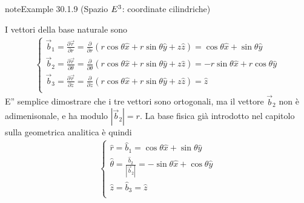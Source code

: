 \documentclass[letterpaper,10pt,italian]{jupyterBook}
\begin{document}
\begin{sphinxadmonition}{note}{Example 30.1.9 (Spazio \protect\(E^3\protect\): coordinate cilindriche)}



\sphinxAtStartPar
I vettori della base naturale sono
\begin{equation*}
\begin{split}\begin{cases}
  \vec{b}_1 = \frac{\partial \vec{r}}{\partial r     } = \frac{\partial }{\partial r     } \left( r \cos \theta \hat{x} + r \sin \theta \hat{y} + z \hat{z} \right) = \cos \theta \hat{x} + \sin \theta \hat{y} \\
  \vec{b}_2 = \frac{\partial \vec{r}}{\partial \theta} = \frac{\partial }{\partial \theta} \left( r \cos \theta \hat{x} + r \sin \theta \hat{y} + z \hat{z} \right) = -r\sin \theta \hat{x} + r \cos \theta\hat{y} \\
  \vec{b}_3 = \frac{\partial \vec{r}}{\partial z     } = \frac{\partial }{\partial z     } \left( r \cos \theta \hat{x} + r \sin \theta \hat{y} + z \hat{z} \right) = \hat{z} \\
\end{cases}\end{split}
\end{equation*}
\sphinxAtStartPar
E” semplice dimostrare che i tre vettori sono ortogonali, ma il vettore \(\vec{b}_2\) non è adimenisonale, e ha modulo \(|\vec{b}_2| = r\). La base fisica \sphinxhyphen{} già introdotto nel capitolo sulla geometrica analitica   \sphinxhyphen{} è quindi
\begin{equation*}
\begin{split}\begin{cases}
  \hat{r}      = \hat{b}_1 = \cos \theta \hat{x} + \sin \theta \hat{y} \\
  \hat{\theta} = \frac{\hat{b}_2}{|\vec{b}_2|} = - \sin \theta \hat{x} + \cos \theta \hat{y} \\
  \hat{z}      = \hat{b}_3 = \hat{z} \\
\end{cases}\end{split}
\end{equation*}\end{sphinxadmonition}
\label{ch/vector-calculus/geometry:def-spherical-coords-e3-base}
\end{document}
